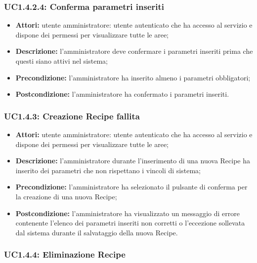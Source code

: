 \subsubsection{UC1.4.2.4: Conferma parametri inseriti}

\begin{itemize}
  	\item \textbf{Attori:} utente amministratore: utente autenticato che ha accesso al servizio e dispone dei permessi per visualizzare tutte le aree;
    \item \textbf{Descrizione:} l'amministratore deve confermare i parametri inseriti prima che questi siano attivi nel sistema;
    \item \textbf{Precondizione:} l'amministratore ha inserito almeno i parametri obbligatori;
    \item \textbf{Postcondizione:} l'amministratore ha confermato i parametri inseriti.
\end{itemize}

\subsubsection{UC1.4.3: Creazione Recipe fallita}

\begin{itemize}
  	\item \textbf{Attori:} utente amministratore: utente autenticato che ha accesso al servizio e dispone dei permessi per visualizzare tutte le aree;
    \item \textbf{Descrizione:} l'amministratore durante l'inserimento di una nuova Recipe ha inserito dei parametri che non rispettano i vincoli di sistema;
    \item \textbf{Precondizione:} l'amministratore ha selezionato il pulsante di conferma per la creazione di una nuova Recipe;
    \item \textbf{Postcondizione:} l'amministratore ha visualizzato un messaggio di errore contenente l'elenco dei parametri inseriti non corretti o l'eccezione sollevata dal sistema durante il salvataggio della nuova Recipe.
\end{itemize}

\subsubsection{UC1.4.4: Eliminazione Recipe}

